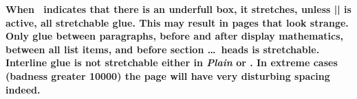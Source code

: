 \begingroup \bf
When \tex\ indicates that there is an underfull box, it stretches, unless
|\raggedbottom| is active,  all stretchable glue. This may result in pages
that look strange. Only glue between paragraphs, before and after display
mathematics, between all list items, and before section \dots\ heads is
stretchable. Interline glue is not stretchable either in {\it Plain\/} or
\intex. In extreme cases (badness greater 10000) the page will have very
disturbing spacing indeed. 
\par\endgroup


\ejectpage
\done